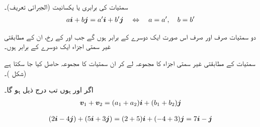 سمتیات کی برابری یا یکسانیت (الجبرائی تعریف)۔
\begin{align}
a{\boldsymbol{i}}+b{\boldsymbol{j}}=a'{\boldsymbol{i}}+b'{\boldsymbol{j}}\quad \Leftrightarrow\quad a=a',\quad b=b'
\end{align}

دو سمتیات صرف اور صرف اس صورت ایک دوسرے کے برابر ہوں گے جب  اور  کے رخ، ان کے مطابقتی غیر سمتی اجزاء ایک دوسرے کے برابر ہوں۔

سمتیات کے مطابقتی غیر سمتی اجزاء کا مجموعہ لے کر ان سمتیات  کا مجموعہ حاصل کیا جا سکتا ہے (شکل )۔

اگر  اور  ہوں تب درج ذیل ہو گا۔ 
\begin{align*}
{\ensuremath{{\boldsymbol{v}}}}_1+{{\boldsymbol{v}}}_2=(a_1+a_2){\boldsymbol{i}}+(b_1+b_2){\boldsymbol{j}}
\end{align*}

\begin{align*}
(2{\boldsymbol{i}}-4{\boldsymbol{j}})+(5{\boldsymbol{i}}+3{\boldsymbol{j}})=(2+5){\boldsymbol{i}}+(-4+3){\boldsymbol{j}}=7{\boldsymbol{i}}-{\boldsymbol{j}}
\end{align*}

